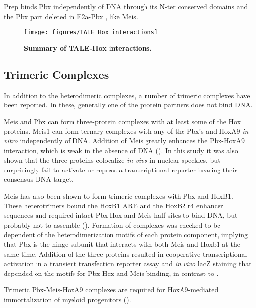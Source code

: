 Prep binds Pbx independently of DNA through its \ac{N-ter} conserved domains and the Pbx part deleted in E2a-Pbx \parencite{Berthelsen1998}, like Meis. 


\begin{figure}[]
  
  \centering
  \texttt{[image: figures/TALE\_Hox\_interactions]}
  \caption[Summary of TALE-Hox interactions]{\textbf{Summary of TALE-Hox interactions.}}
  \label{fig:TALE_Hox_interactions}
\end{figure}


\subsection{Trimeric Complexes}

In addition to the heterodimeric complexes, a number of trimeric complexes have been reported. In these, generally one of the protein partners does not bind DNA. 

Meis and Pbx can form three-protein complexes with at least some of the Hox proteins. Meis1 can form ternary complexes with any of the Pbx's and HoxA9 \textit{in vitro} independently of DNA. Addition of Meis greatly enhances the  Pbx-HoxA9 interaction, which is weak in the absence of DNA (\cite{Shen1999}). In this study it was also shown that the three proteins colocalize \textit{in vivo} in nuclear speckles, but surprisingly fail to activate or repress a transcriptional reporter bearing their consensus DNA target. 

Meis has also been shown to form trimeric complexes with Pbx and HoxB1. These heterotrimers bound the HoxB1 ARE and the HoxB2 r4 enhancer sequences and required intact Pbx-Hox and Meis half-sites to bind DNA, but probably not to assemble (\cite{Jacobs1999}). Formation of complexes was checked to be dependent of the heterodimerization motifs of each protein component, implying that Pbx is the hinge subunit that interacts with both Meis and Hoxb1 at the same time. Addition of the three proteins resulted in cooperative transcriptional activation in a transient transfection reporter assay and \textit{in vivo} lacZ staining that depended on the motifs for Pbx-Hox and Meis binding, in contrast to \cite{Shen1999}. 

Trimeric Pbx-Meis-HoxA9 complexes are required for HoxA9-mediated immortalization of myeloid progenitors (\cite{Schnabel2000}).



